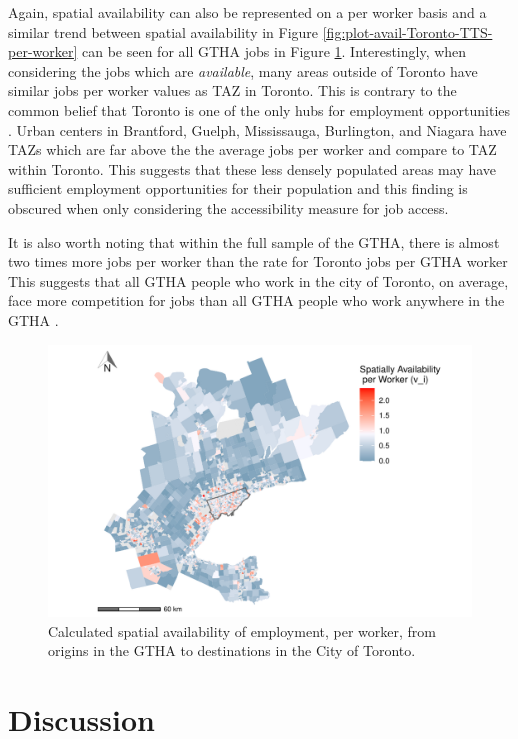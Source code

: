 \documentclass[]{elsarticle} %
\begin{document}
Again, spatial availability can also be represented on a per worker
basis and a similar trend between spatial availability in Figure
\ref{fig:plot-avail-Toronto-TTS-per-worker} can be seen for all GTHA
jobs in Figure \ref{fig:plot-avail-GGH-TTS-per-worker}. Interestingly,
when considering the jobs which are \emph{available}, many areas outside
of Toronto have similar jobs per worker values as TAZ in Toronto. This
is contrary to the common belief that Toronto is one of the only hubs
for employment opportunities . Urban centers in Brantford, Guelph,
Mississauga, Burlington, and Niagara have TAZs which are far above the
the average jobs per worker and compare to TAZ within Toronto. This
suggests that these less densely populated areas may have sufficient
employment opportunities for their population and this finding is
obscured when only considering the accessibility measure for job access.

It is also worth noting that within the full sample of the GTHA, there
is almost two times more jobs per worker than the rate for Toronto jobs
per GTHA worker This suggests that all GTHA people who work in the city
of Toronto, on average, face more competition for jobs than all GTHA
people who work anywhere in the GTHA .

\begin{figure}
\includegraphics[width=1\linewidth]{Spatial-Availability_files/figure-latex/plot-avail-GGH-TTS-per-worker-1} \caption{\label{fig:plot-avail-GGH-TTS-per-worker}Calculated spatial availability of employment, per worker, from origins in the GTHA to destinations in the City of Toronto.}\label{fig:plot-avail-GGH-TTS-per-worker}
\end{figure}
\newpage

\hypertarget{discussion}{%
\section{Discussion}\label{discussion}}
\end{document}
